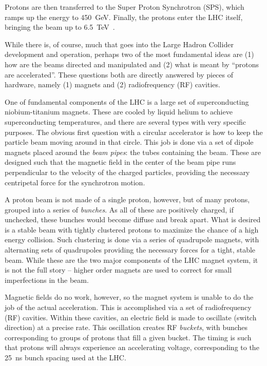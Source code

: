 Protons are then transferred to the Super Proton Synchrotron (SPS), which ramps up the energy to 
\SI{450}{\GeV}. Finally, the protons enter the LHC itself, bringing the beam up to \SI{6.5}{\TeV}~\cite{accelerator}.

While there is, of course, much that goes into the Large Hadron Collider development and operation, perhaps
two of the most fundamental ideas are (1) how are the beams directed and manipulated and (2) what is 
meant by ``protons are accelerated''. These questions both are directly answered by pieces of hardware,
namely (1) magnets and (2) radiofrequency (RF) cavities.

One of fundamental components of the LHC is a large set of superconducting niobium-titanium magnets. These 
are cooled by liquid helium to achieve superconducting temperatures, and there are several types with very 
specific purposes. The obvious first question with a circular accelerator is how to keep the particle beam 
moving around in that circle. This job is done via a set of dipole magnets placed around the \emph{beam pipes}: the 
tubes containing the beam. These are designed such that the magnetic field in the center of the beam pipe runs 
perpendicular to the velocity of the charged particles, providing the necessary centripetal force for 
the synchrotron motion.

A proton beam is not made of a single proton, however, but of many protons, grouped into a series of \emph{bunches}.
As all of these are positively charged, if unchecked, these bunches would become diffuse and break apart. What is 
desired is a stable beam with tightly clustered protons to maximize the chance of a high energy collision.
Such clustering is done via a series of quadrupole magnets, with alternating sets of quadrupoles providing 
the necessary forces for a tight, stable beam. While these are the two major components of the LHC magnet system, 
it is not the full story -- higher order magnets are used to correct for small imperfections in the beam.

Magnetic fields do no work, however, so the magnet system is unable to do the job of the actual acceleration. This is 
accomplished via a set of radiofrequency (RF) cavities. Within these cavities, an electric field is made to 
oscillate (switch direction) at a precise rate. This oscillation creates RF \emph{buckets}, with 
bunches corresponding to groups of protons that fill a given bucket. The timing is such that protons will always 
experience an accelerating voltage, corresponding to the \SI{25}{\ns} bunch spacing used at the LHC.


